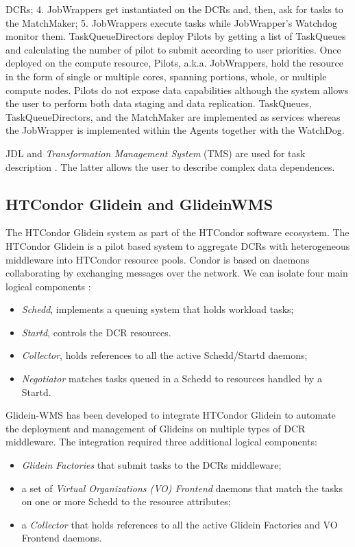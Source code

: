 DCRs; 4. JobWrappers get instantiated on the DCRs and, then,  ask for tasks to the MatchMaker; 5. JobWrappers execute tasks while JobWrapper’s Watchdog monitor them.
TaskQueueDirectors deploy Pilots by getting a list of TaskQueues and calculating the number of pilot to submit  according to user priorities.
Once deployed on the compute resource, Pilots, a.k.a. JobWrappers, hold the resource in the form of single or multiple cores, spanning portions, whole, or multiple compute nodes. Pilots do not expose data capabilities although the system allows the user to perform both data staging and data replication. 
TaskQueues, TaskQueueDirectors, and the MatchMaker are implemented as services whereas the JobWrapper is implemented within the Agents together with the WatchDog. 

JDL and \emph{Transformation Management System} (TMS) are used for task description \cite{Tsaregorodtsev2006,Pacini2006}. The latter allows the user to describe complex data dependences. 
\subsection{HTCondor Glidein and GlideinWMS}
The HTCondor Glidein system  as part of the HTCondor software ecosystem. The HTCondor Glidein is a pilot based system to aggregate DCRs with heterogeneous middleware into HTCondor resource pools.
Condor is based on daemons collaborating by exchanging messages over the network. We can isolate four main logical components \cite{Sfiligoi2008}:
\begin{itemize}
\item \emph{Schedd}, implements a queuing system that holds workload tasks;
\item \emph{Startd}, controls the DCR resources. 
\item \emph{Collector}, holds references to all the active
Schedd/Startd daemons; 
\item \emph{Negotiator} matches tasks queued in a Schedd to resources handled by a Startd.
\end{itemize}
Glidein-WMS has been developed to integrate HTCondor Glidein to  automate the deployment and management of Glideins on multiple types of DCR middleware. 
The integration required three additional logical components: 
\begin{itemize}
\item \emph{Glidein Factories} that submit tasks to the DCRs middleware;
\item a set of \emph{Virtual Organizations (VO) Frontend} daemons that match the tasks on one or more Schedd to the resource attributes;
\item a \emph{Collector} that holds references to all the active Glidein Factories and VO Frontend daemons. 
\end{itemize}

